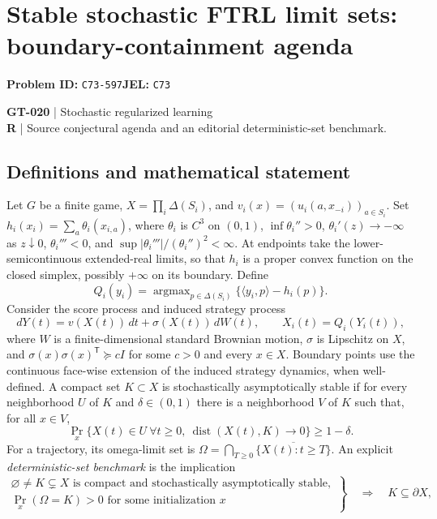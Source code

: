 \documentclass[11pt,a4paper]{article}
\begin{document}
\section*{Stable stochastic FTRL limit sets: boundary-containment agenda}
\textbf{Problem ID:} \texttt{C73-597}\quad \textbf{JEL:} \texttt{C73}\par
\label{problem:OP-0150}
\label{game:GT-020}
{\sffamily\small\color{muted}
\textbf{GT-020} | Stochastic regularized learning\\
\textbf{R} | Source conjectural agenda and an editorial deterministic-set benchmark.
\par}
\subsection*{Definitions and mathematical statement}
Let $G$ be a finite game, $X=\prod_i\Delta(S_i)$, and $v_i(x)=(u_i(a,x_{-i}))_{a\in S_i}$. Set $h_i(x_i)=\sum_a\theta_i(x_{i,a})$, where $\theta_i$ is $C^3$ on $(0,1)$, $\inf\theta_i''>0$, $\theta_i'(z)\to-\infty$ as $z\downarrow0$, $\theta_i'''<0$, and $\sup|\theta_i'''|/(\theta_i'')^2<\infty$. At endpoints take the lower-semicontinuous extended-real limits, so that $h_i$ is a proper convex function on the closed simplex, possibly $+\infty$ on its boundary. Define
\[
 Q_i(y_i)=\operatorname{argmax}_{p\in\Delta(S_i)}
 \{\langle y_i,p\rangle-h_i(p)\}.
\]
Consider the score process and induced strategy process
\[
 dY(t)=v(X(t))\,dt+\sigma(X(t))\,dW(t),\qquad X_i(t)=Q_i(Y_i(t)),
\]
where $W$ is a finite-dimensional standard Brownian motion, $\sigma$ is Lipschitz on $X$, and $\sigma(x)\sigma(x)^{\mathsf T}\succeq cI$ for some $c>0$ and every $x\in X$. Boundary points use the continuous face-wise extension of the induced strategy dynamics, when well-defined.
A compact set $K\subset X$ is stochastically asymptotically stable if for every neighborhood $U$ of $K$ and $\delta\in(0,1)$ there is a neighborhood $V$ of $K$ such that, for all $x\in V$,
\[
 \Pr_x\{X(t)\in U\ \forall t\geq0,\ \operatorname{dist}(X(t),K)\to0\}\geq1-\delta.
\]
For a trajectory, its omega-limit set is $\Omega=\bigcap_{T\geq0}\overline{\{X(t):t\geq T\}}$. An explicit \emph{deterministic-set benchmark} is the implication
\[
 \left.
 \begin{gathered}
 \varnothing\ne K\subsetneq X\text{ is compact and stochastically asymptotically stable},\\
 \Pr_x(\Omega=K)>0\text{ for some initialization }x
 \end{gathered}\right\}
 \quad\Longrightarrow\quad K\subseteq\partial X,
\]
\end{document}

